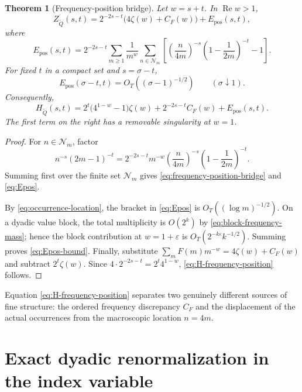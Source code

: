 \documentclass[11pt]{article}
\newtheorem{theorem}{Theorem}[section]
\theoremstyle{definition}
\theoremstyle{remark}
\newcommand{\Qp}{\widetilde Q}
\newcommand{\RePart}{\operatorname{Re}}
\newcommand{\eps}{\varepsilon}
\begin{document}
\begin{theorem}[Frequency-position bridge]
\label{thm:frequency-position-bridge}
Let \(w=s+t\).  In \(\RePart w>1\),
\begin{equation}
{
Z_{\Qp}(s,t)
=2^{-2s-t}\bigl(4\zeta(w)+C_F(w)\bigr)
+E_{\mathrm{pos}}(s,t),
}
\label{eq:frequency-position-bridge}
\end{equation}
where
\begin{equation}
E_{\mathrm{pos}}(s,t)
=2^{-2s-t}
\sum_{m\ge1}\frac{1}{m^w}
\sum_{n\in\mathcal N_m}
\left[
\left(\frac{n}{4m}\right)^{-s}
\left(1-\frac1{2m}\right)^{-t}-1
\right].
\label{eq:Epos}
\end{equation}
For fixed \(t\) in a compact set and \(s=\sigma-t\),
\begin{equation}
E_{\mathrm{pos}}(\sigma-t,t)
=O_T\!\left((\sigma-1)^{-1/2}\right)
\qquad(\sigma\downarrow1).
\label{eq:Epos-bound}
\end{equation}
Consequently,
\begin{equation}
{
H_{\Qp}(s,t)
=2^t\bigl(4^{1-w}-1\bigr)\zeta(w)
+2^{-2s-t}C_F(w)
+E_{\mathrm{pos}}(s,t).
}
\label{eq:H-frequency-position}
\end{equation}
The first term on the right has a removable singularity at \(w=1\).
\end{theorem}

\begin{proof}
For \(n\in\mathcal N_m\), factor
\[
n^{-s}(2m-1)^{-t}
=2^{-2s-t}m^{-w}
\left(\frac{n}{4m}\right)^{-s}
\left(1-\frac1{2m}\right)^{-t}.
\]
Summing first over the finite set \(\mathcal N_m\) gives \eqref{eq:frequency-position-bridge} and \eqref{eq:Epos}.

By \eqref{eq:occurrence-location}, the bracket in \eqref{eq:Epos} is
\(O_T((\log m)^{-1/2})\).  On a dyadic value block, the total multiplicity is \(O(2^k)\) by \eqref{eq:block-frequency-mass}; hence the block contribution at \(w=1+\eps\) is
\(O_T(2^{-k\eps}k^{-1/2})\).  Summing proves \eqref{eq:Epos-bound}.  Finally, substitute
\(\sum_mF(m)m^{-w}=4\zeta(w)+C_F(w)\) and subtract \(2^t\zeta(w)\).  Since
\(4\cdot2^{-2s-t}=2^t4^{1-w}\), \eqref{eq:H-frequency-position} follows.
\end{proof}

Equation \eqref{eq:H-frequency-position} separates two genuinely different sources of fine structure: the ordered frequency discrepancy \(C_F\) and the displacement of the actual occurrences from the macroscopic location \(n=4m\).

\section{Exact dyadic renormalization in the index variable}
\end{document}
